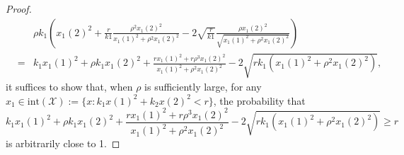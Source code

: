 \documentclass[10pt,a4paper]{amsart}
\begin{document}
\begin{proof}
\begin{eqnarray}
		&& \rho k_1 \left(x_1(2)^2 + \frac{r}{k1}\frac{\rho^2x_1(2)^2}{x_1(1)^{2} + \rho^{2} x_1(2)^{2}} - 2\sqrt{\frac{r}{k1}}\frac{\rho x_1(2)^2}{\sqrt{x_1(1)^{2} + \rho^{2} x_1(2)^{2}}}\right) \nonumber\\
		&=& k_1 x_1(1)^2 + \rho k_1 x_1(2)^2 + \frac{rx_1(1)^{2} + r \rho^3x_1(2)^{2}}{x_1(1)^{2} + \rho^{2} x_1(2)^{2}} - 2\sqrt{rk_1\left(x_1(1)^{2} + \rho^{2} x_1(2)^{2}\right)}, \nonumber
	\end{eqnarray}
	it suffices to show that, when $\rho$ is sufficiently large, for any $x_1 \in \text{int}(\mathcal{X}) := \{ x : k_1 x(1)^2 + k_2 x(2)^2 < r \}$, the probability that
	\begin{equation}\label{eq3}
		k_1 x_1(1)^2 + \rho k_1 x_1(2)^2 + \dfrac{r x_1(1)^2 + r \rho^3 x_1(2)^2}{x_1(1)^2 + \rho^2 x_1(2)^2} - 2 \sqrt{ r k_1 \left( x_1(1)^2 + \rho^2 x_1(2)^2 \right) } \ge r
	\end{equation}
	is arbitrarily close to 1.
	

\end{proof}
\end{document}
